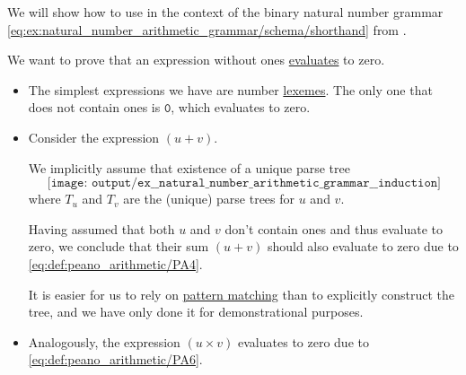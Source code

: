 \begin{example}\label{ex:natural_number_arithmetic_grammar/induction}
  We will show how to use  in the context of the binary natural number grammar \eqref{eq:ex:natural_number_arithmetic_grammar/schema/shorthand} from .

  We want to prove that an expression without ones \hyperref[con:evaluation]{evaluates} to zero.

  \begin{itemize}
    \item The simplest expressions we have are number \hyperref[con:abstract_syntax_tree/lexical]{lexemes}. The only one that does not contain ones is \( \mathtt{0} \), which evaluates to zero.

    \item Consider the expression \( (u + v) \).

    We implicitly assume that existence of a unique parse tree
    \begin{equation*}
      \texttt{[image: output/ex\_\_natural\_number\_arithmetic\_grammar\_\_induction]}
    \end{equation*}
    where \( T_u \) and \( T_v \) are the (unique) parse trees for \( u \) and \( v \).

    Having assumed that both \( u \) and \( v \) don't contain ones and thus evaluate to zero, we conclude that their sum \( (u + v) \) should also evaluate to zero due to \ref{eq:def:peano_arithmetic/PA4}.

    It is easier for us to rely on \hyperref[con:evaluation]{pattern matching} than to explicitly construct the tree, and we have only done it for demonstrational purposes.

    \item Analogously, the expression \( (u \times v) \) evaluates to zero due to \ref{eq:def:peano_arithmetic/PA6}.
  \end{itemize}
\end{example}
